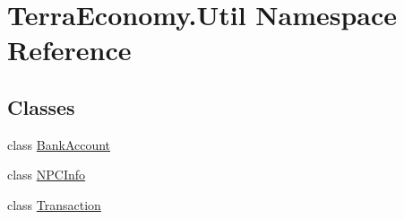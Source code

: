 \hypertarget{namespace_terra_economy_1_1_util}{}\section{Terra\+Economy.\+Util Namespace Reference}
\label{namespace_terra_economy_1_1_util}
\subsection*{Classes}
\begin{DoxyCompactItemize}
\item 
class \hyperlink{class_terra_economy_1_1_util_1_1_bank_account}{Bank\+Account}
\item 
class \hyperlink{class_terra_economy_1_1_util_1_1_n_p_c_info}{N\+P\+C\+Info}
\item 
class \hyperlink{class_terra_economy_1_1_util_1_1_transaction}{Transaction}
\end{DoxyCompactItemize}

